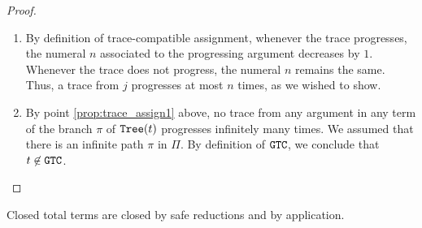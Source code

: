 \begin{proof}
\begin{enumerate}
\item
By definition of trace-compatible assignment, whenever the trace progresses, 
the numeral $n$ associated to the progressing argument decreases by $1$.
Whenever the trace does not progress, the numeral $n$ remains the same.
Thus, a trace from $j$ progresses at most $n$ times, as we wished to show.
\item
By point \ref{prop:trace_assign1} above, 
no trace from any argument in any term of the branch $\pi$ of ${\tt Tree}(t)$ progresses infinitely many times.
We assumed that there is an infinite path $\pi$ in $\Pi$.
By definition of ${\tt GTC}$, we conclude that $t \not \in {\tt GTC}$. 
\end{enumerate}
\end{proof}

Closed total terms are closed by safe reductions and by application. 


